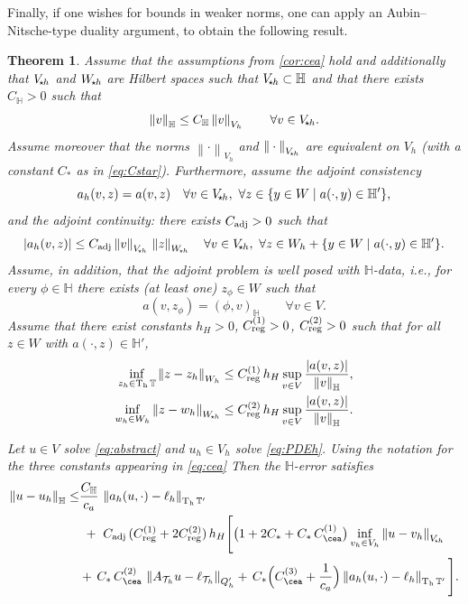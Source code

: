 \documentclass[11pt]{article}
\theoremstyle{definition}
\theoremstyle{plain}
\newtheorem{theorem}{Theorem}[section]
\newcommand{\ca}{c_a}
\newcommand{\CD}{C_*}
\newcommand{\Vsh}{V_{\!\star \hspace*{-0.2mm}h}}
\newcommand{\Wsh}{W_{\!\star \hspace*{-0.2mm}h}}
\newcommand{\dgnorm}[1]{\norm{#1}_{V_h}}
\newcommand{\tdgnorm}[1]{{\Vert#1\Vert}_{\Vsh}}
\newcommand{\Th}{{\calT_h}}
\newcommand{\Qh}{Q_h}
\newcommand{\ATh}{A_{\Th}}
\DeclareMathOperator{\tch}{T_h}
\newcommand*{\norm}[1]{\left\|#1\right\|}
\newcommand{\IH}{\mathbb{H}}
\newcommand{\ITh}{\mathbb{T}}
\newcommand{\calT}{\mathcal{T}}
\begin{document}
Finally, if one wishes for bounds in weaker norms, one can apply an Aubin--Nitsche-type duality argument, to obtain the following result.
\begin{theorem} \label{th:aubinnitsche}
Assume that the assumptions from \cref{cor:cea} hold and additionally that $\Vsh$ and $\Wsh$ are Hilbert spaces such that
$\Vsh\subset \IH$ and that there exists $C_{\IH}>0$ such that
\begin{equation}\label{eq:IH_DG_dom}
    \norm{v}_{\IH}\le C_{\IH}\dgnorm{v}\qquad\forall v\in\Vsh.
\end{equation}
Assume moreover that the norms $\dgnorm{\cdot}$ and $\tdgnorm{\cdot}$ are equivalent on $V_h$ (with a constant $\CD$ as in \eqref{eq:Cstar}).
Furthermore, assume the adjoint consistency
\begin{equation}
\label{eq:a-bit-consistent-exp}
a_h(v, z) = a(v,z) \quad \forall v \in \Vsh,\ \forall z \in \{y\in W\mid a(\cdot,y)\in \IH' \},
\end{equation}
and the adjoint continuity: there exists $C_{\rm adj}>0$ such that
\begin{equation}
\label{eq:a-bit-cont-exp}
|a_h(v, z)| \le C_{\rm adj}\,\tdgnorm{v}\,\norm{z}_{\Wsh}
\quad \forall v \in \Vsh,\ \forall z \in  W_h + \{y\in W\mid a(\cdot,y)\in \IH' \}.
\end{equation}
Assume, in addition, that the adjoint problem is well posed with $\IH$-data, i.e.,
for every $\phi\in \IH$ there exists (at least one) $z_\phi\in W$ such that
\begin{equation}\label{eq:adjoint-IH-wellposed}
a(v,z_\phi) = (\phi,v)_{\IH}\qquad\forall v\in V.
\end{equation}
Assume that there exist constants $h_H>0$, $C_{\rm reg}^{(1)}>0$, $C_{\rm reg}^{(2)}>0$ such that for all
$z\in W$ with $a(\cdot,z)\in \IH'$,
\begin{align}
\label{eq:H-reg-bound-exp}
\inf_{z_h \in \tch \ITh} \norm{z -z_h}_{ W_h}
&\le C_{\rm reg}^{(1)}\,h_H \sup_{v\in V} \frac{|a(v,z)|}{\norm{v}_{\IH}},
\\
\label{eq:H-reg-bound2-exp}
\inf_{w_h \in  W_h} \norm{z -w_h}_{\Wsh}
&\le C_{\rm reg}^{(2)}\,h_H \sup_{v\in V} \frac{|a(v,z)|}{\norm{v}_{\IH}}.
\end{align}

Let $u\in V$ solve \eqref{eq:abstract} and $u_h\in V_h$ solve \eqref{eq:PDEh}.
Using the notation for the three constants appearing in \eqref{eq:cea}
Then the $\IH$-error satisfies
\begin{equation}\label{eq:IH_bound_framework}
\begin{aligned}
\norm{u-u_h}_{\IH}
\le &
\frac{C_{\IH}}{\ca}\,\norm{a_h(u,\cdot)-\ell_h}_{\tch\ITh'}
\\
&\ +\ C_{\rm adj}\,(C_{\rm reg}^{(1)}+2C_{\rm reg}^{(2)})\,h_H
\Bigg[
\bigl(1+2\CD+\CD\,C_{\cea}^{(1)}\bigr)\inf_{v_h\in V_h}\tdgnorm{u-v_h}
\\
&
+\, \CD\,C_{\cea}^{(2)}\,\norm{\ATh u-\ell_\Th}_{\Qh'}
+\, \CD\Bigl(C_{\cea}^{(3)}+\frac1{\ca}\Bigr)\norm{a_h(u,\cdot)-\ell_h}_{\tch\ITh'}
\Bigg].
\end{aligned}
\end{equation}
\end{theorem}
\end{document}

